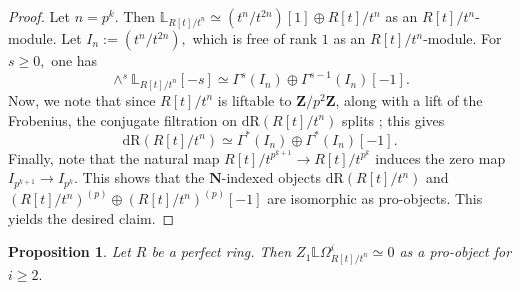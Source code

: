 \documentclass[10pt,letterpaper]{amsart}
\numberwithin{figure}{section}
\numberwithin{equation}{section}
\newtheorem{proposition}[figure]{Proposition}
\theoremstyle{definition}
\theoremstyle{definition}
\theoremstyle{definition}
\theoremstyle{definition}
\newcommand{\LL}{\L}
\renewcommand{\L}{\mathbb{L}}
\newcommand{\Z}{\mathbf{Z}}
\begin{document}
\begin{proof}
   Let $n = p^k.$ Then $\LL_{R[t]/t^n} \simeq (t^n/t^{2n})[1] \oplus R[t]/t^n$ as an $R[t]/t^n$-module. Let $I_n:= (t^n/t^{2n}),$ which is free of rank $1$ as an $R[t]/t^n$-module. For $s \ge 0,$ one has $$\wedge^s \LL_{R[t]/t^n}[-s] \simeq \Gamma^s(I_n) \oplus \Gamma^{s-1}(I_n)[-1].$$ Now, we note that since $R[t]/t^n$ is liftable to $\Z/p^2 \Z$, along with a lift of the Frobenius, the conjugate filtration on $\mathrm{dR}(R[t]/t^n)$ splits \cite[Prop.~3.17]{Bha12}; this gives
$$\mathrm{dR}(R[t]/t^n) \simeq \Gamma^* (I_n) \oplus \Gamma^* (I_n)[-1].$$ Finally, note that the natural map $R[t]/t^{p^{k+1}} \to R[t]/t^{p^{k}}$ induces the zero map $I_{p^{k+1}} \to I_{p^k}.$ This shows that the $\mathbf N$-indexed objects $\mathrm{dR}(R[t]/t^n)$ and $(R[t]/t^n)^{(p)} \oplus (R[t]/t^n)^{(p)}[-1]$ are isomorphic as pro-objects. This yields the desired claim.
\end{proof}{}






\begin{proposition}\label{pack}
    Let $R$ be a perfect ring. Then $Z_1 \LL \Omega^i_{R[t]/t^n} \simeq 0$ as a pro-object for $i \ge 2.$
\end{proposition}{}
\end{document}
